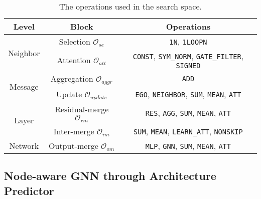 \documentclass[sigconf]{acmart}
\begin{document}
\begin{table}[]
	\footnotesize
	\caption{The operations used in the search space. }
\begin{tabular}{c|c|c}
	\hline
	Level & Block                          & Operations                                                                 \\ \hline
	\multirow{2}{*}{Neighbor} & Selection $\mathcal{O}_{se}$       & \texttt{1N}, \texttt{1LOOPN}                                               \\ \cline{2-3} 
	& Attention $\mathcal{O}_{att}$      & \texttt{CONST}, \texttt{SYM\_NORM}, \texttt{GATE\_FILTER}, \texttt{SIGNED} \\ \hline
	\multirow{2}{*}{Message}  
	& Aggregation $\mathcal{O}_{aggr}$   & \texttt{ADD}                                                               \\ \cline{2-3} 
	& Update $\mathcal{O}_{update}$      & \texttt{EGO}, \texttt{NEIGHBOR}, \texttt{SUM}, \texttt{MEAN}, \texttt{ATT} \\ \hline
	\multirow{2}{*}{Layer}    
	& Residual-merge  $\mathcal{O}_{rm}$ & \texttt{RES}, \texttt{AGG}, \texttt{SUM}, \texttt{MEAN}, \texttt{ATT}      \\ \cline{2-3} 
	& Inter-merge $\mathcal{O}_{im}$                       & \texttt{SUM}, \texttt{MEAN}, \texttt{LEARN\_ATT}, \texttt{NONSKIP}         \\ \hline
	Network                   & Output-merge $\mathcal{O}_{om}$                      & \texttt{MLP}, \texttt{GNN}, \texttt{SUM}, \texttt{MEAN}, \texttt{ATT}      \\ \hline
\end{tabular}
\label{tb-search-space}
\end{table}

\subsection{Node-aware GNN through Architecture Predictor}
\end{document}
